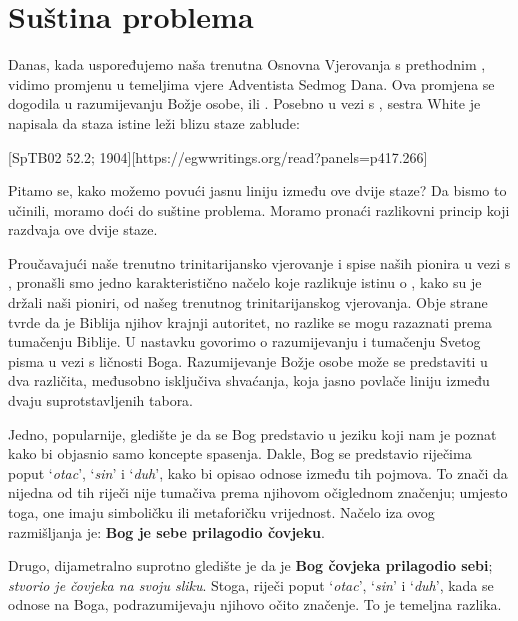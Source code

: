 \chapter{Suština problema}

Danas, kada uspoređujemo naša trenutna Osnovna Vjerovanja s prethodnim , vidimo promjenu u temeljima vjere Adventista Sedmog Dana. Ova promjena se dogodila u razumijevanju Božje osobe, ili . Posebno u vezi s , sestra White je napisala da staza istine leži blizu staze zablude:

[SpTB02 52.2; 1904][https://egwwritings.org/read?panels=p417.266]

Pitamo se, kako možemo povući jasnu liniju između ove dvije staze? Da bismo to učinili, moramo doći do suštine problema. Moramo pronaći razlikovni princip koji razdvaja ove dvije staze.

Proučavajući naše trenutno trinitarijansko vjerovanje i spise naših pionira u vezi s , pronašli smo jedno karakteristično načelo koje razlikuje istinu o , kako su je držali naši pioniri, od našeg trenutnog trinitarijanskog vjerovanja. Obje strane tvrde da je Biblija njihov krajnji autoritet, no razlike se mogu razaznati prema tumačenju Biblije. U nastavku govorimo o razumijevanju i tumačenju Svetog pisma u vezi s ličnosti Boga. Razumijevanje Božje osobe može se predstaviti u dva različita, međusobno isključiva shvaćanja, koja jasno povlače liniju između dvaju suprotstavljenih tabora.

Jedno, popularnije, gledište je da se Bog predstavio u jeziku koji nam je poznat kako bi objasnio samo koncepte spasenja. Dakle, Bog se predstavio riječima poput ‘\textit{otac}’, ‘\textit{sin}’ i ‘\textit{duh}’, kako bi opisao odnose između tih pojmova. To znači da nijedna od tih riječi nije tumačiva prema njihovom očiglednom značenju; umjesto toga, one imaju simboličku ili metaforičku vrijednost. Načelo iza ovog razmišljanja je: \textbf{Bog je sebe prilagodio čovjeku}.

Drugo, dijametralno suprotno gledište je da je \textbf{Bog čovjeka prilagodio sebi}; \textit{stvorio je čovjeka na svoju sliku}. Stoga, riječi poput ‘\textit{otac}’, ‘\textit{sin}’ i ‘\textit{duh}’, kada se odnose na Boga, podrazumijevaju njihovo očito značenje. To je temeljna razlika.

